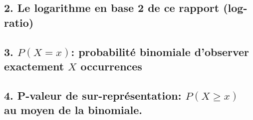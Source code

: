 \documentclass[]{article}
\newenvironment{Shaded}{\begin{snugshade}}{\end{snugshade}}
\newcommand{\KeywordTok}[1]{\textcolor[rgb]{0.94,0.87,0.69}{#1}}
\newcommand{\DataTypeTok}[1]{\textcolor[rgb]{0.87,0.87,0.75}{#1}}
\newcommand{\DecValTok}[1]{\textcolor[rgb]{0.86,0.86,0.80}{#1}}
\newcommand{\StringTok}[1]{\textcolor[rgb]{0.80,0.58,0.58}{#1}}
\newcommand{\OtherTok}[1]{\textcolor[rgb]{0.94,0.94,0.56}{#1}}
\newcommand{\OperatorTok}[1]{\textcolor[rgb]{0.94,0.94,0.82}{#1}}
\newcommand{\NormalTok}[1]{\textcolor[rgb]{0.80,0.80,0.80}{#1}}
\begin{document}
\subsection{2. Le logarithme en base 2 de ce rapport
(log-ratio)}\label{le-logarithme-en-base-2-de-ce-rapport-log-ratio}

\begin{Shaded}
\end{Shaded}

\subsection{\texorpdfstring{3. \(P(X= x)\): probabilité binomiale
d'observer exactement \(X\)
occurrences}{3. P(X= x): probabilité binomiale d'observer exactement X occurrences}}\label{px-x-probabilite-binomiale-dobserver-exactement-x-occurrences}

\begin{Shaded}
\end{Shaded}

\subsection{\texorpdfstring{4. P-valeur de sur-représentation:
\(P(X \ge x)\) au moyen de la
binomiale.}{4. P-valeur de sur-représentation: P(X \textbackslash{}ge x) au moyen de la binomiale.}}\label{p-valeur-de-sur-representation-px-ge-x-au-moyen-de-la-binomiale.}

\begin{Shaded}
\end{Shaded}
\end{document}

